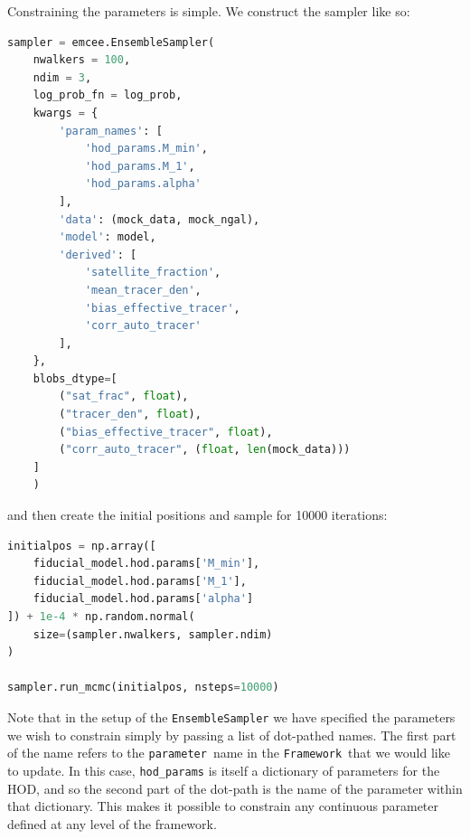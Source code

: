\documentclass[5p,aas_macros]{elsarticle}
\newcommand{\framework}{\texttt{Framework}}
\newcommand{\parameter}{\texttt{parameter}}
\begin{document}
Constraining the parameters is simple. We construct the sampler like so:
\begin{lstlisting}[language=Python]
sampler = emcee.EnsembleSampler(
	nwalkers = 100,
	ndim = 3,
	log_prob_fn = log_prob,
	kwargs = {
		'param_names': [
			'hod_params.M_min', 
			'hod_params.M_1', 
			'hod_params.alpha'
		],  
		'data': (mock_data, mock_ngal), 
		'model': model,  
		'derived': [
			'satellite_fraction', 
			'mean_tracer_den',
			'bias_effective_tracer',
			'corr_auto_tracer'
		],
	},
	blobs_dtype=[
		("sat_frac", float), 
		("tracer_den", float), 
		("bias_effective_tracer", float),
		("corr_auto_tracer", (float, len(mock_data)))
	]
	)
\end{lstlisting}

and then create the initial positions and sample for 10000 iterations:
%
\begin{lstlisting}[language=Python]
initialpos = np.array([
	fiducial_model.hod.params['M_min'], 
	fiducial_model.hod.params['M_1'],
	fiducial_model.hod.params['alpha']
]) + 1e-4 * np.random.normal(
	size=(sampler.nwalkers, sampler.ndim)
)
	
sampler.run_mcmc(initialpos, nsteps=10000)
\end{lstlisting}
Note that in the setup of the \verb|EnsembleSampler| we have specified the parameters we wish to constrain simply by passing a list of dot-pathed names.
The first part of the name refers to the \parameter\ name in the \framework\ that we would like to update. In this case, \verb|hod_params| is itself a dictionary of parameters for the HOD, and so the second part of the dot-path is the name of the parameter within that dictionary. This makes it possible to constrain any continuous parameter defined at any level of the framework.
\end{document}
